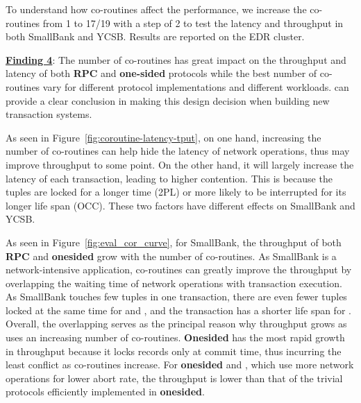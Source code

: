 To understand how co-routines affect the performance, we increase the co-routines from 1 to 17/19 with a step of 2 to test the latency and throughput in both SmallBank and YCSB. Results are reported on the EDR cluster. 

\underline{\bf Finding 4}: The number of co-routines has great impact on the throughput and latency of both \textbf{RPC} and \textbf{one-sided} protocols while the best number of co-routines vary for different protocol implementations and different workloads. \projectname can provide a clear conclusion in making this design decision when building new transaction systems.

As seen in Figure~\ref{fig:coroutine-latency-tput}, on one hand, increasing the number of co-routines can help hide the latency of network operations, thus may improve throughput to some point. On the other hand, it will largely increase the latency of each transaction, leading to higher contention. This is because the tuples are locked for a longer time (2PL) or more likely to be interrupted for its longer life span (OCC). These two factors have different effects on SmallBank and YCSB.

As seen in Figure~\ref{fig:eval_cor_curve}, for SmallBank, the throughput of both \textbf{RPC} and \textbf{onesided} grow with the number of co-routines. As SmallBank is a network-intensive application, co-routines can greatly improve the throughput by overlapping the waiting time of network operations with transaction execution. As SmallBank touches few tuples in one transaction, there are even fewer tuples locked at the same time for \nowait and \waitdie, and the transaction has a shorter life span for \occ. Overall, the overlapping serves as the principal reason why throughput grows as \projectname uses an increasing number of co-routines. \textbf{Onesided} \occ has the most rapid growth in throughput because it locks records only at commit time, thus incurring the least conflict as co-routines increase. For \textbf{onesided} \mvcc and \sundial, which use more network operations for lower abort rate, the throughput is lower than that of the trivial protocols efficiently implemented in \textbf{onesided}.


